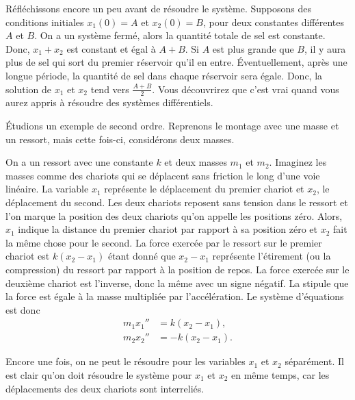\begin{example}
Réfléchissons encore un peu avant de résoudre le système. Supposons des conditions initiales $x_1(0) = A$ et $x_2(0) = B$, pour deux constantes différentes $A$ et $B$.  On a un système fermé, alors la quantité totale de sel est constante. Donc, $x_1+x_2$ est constant et égal à $A+B$.
Si $A$ est plus grande que $B$, il y aura plus de sel qui sort du premier réservoir qu’il en entre. Éventuellement, après une longue période, la quantité de sel dans chaque réservoir sera égale. Donc, la solution de $x_1$ et $x_2$ tend vers $\frac{A+B}{2}$.  Vous découvrirez que c'est vrai quand vous aurez appris à résoudre des systèmes différentiels.
\end{example}

\begin{example} \label{sintro:carts-example}
Étudions un exemple de second ordre. Reprenons le montage avec une masse et un ressort, mais cette fois-ci, considérons deux masses.

\begin{mywrapfigsimp}{2.0in}{2.3in}
\noindent
{}
\end{mywrapfigsimp}
On a un ressort avec une constante $k$ et deux masses $m_1$
et $m_2$. Imaginez les masses comme des chariots qui se déplacent sans friction le long d'une voie linéaire. La variable $x_1$ représente le déplacement du premier chariot et $x_2$, le déplacement du second. Les deux chariots reposent sans tension dans le ressort et l'on marque la position des deux chariots qu'on appelle les positions zéro. Alors, $x_1$ indique la distance du premier chariot par rapport à sa position zéro et $x_2$ fait la même chose pour le second. La force exercée par le ressort sur le premier chariot est
$k(x_2-x_1)$ étant donné que 
$x_2-x_1$ représente l’étirement (ou la compression) du ressort par rapport à la position de repos. La force exercée sur le deuxième chariot est l'inverse, donc la même avec un signe négatif. La 
 stipule que la force est égale à la masse multipliée par l’accélération. Le système d’équations est donc
\begin{align*}
m_1 x_1'' & = k(x_2-x_1) , \\
m_2 x_2'' & = - k(x_2-x_1) .
\end{align*}

Encore une fois, on ne peut le résoudre pour les variables $x_1$ et $x_2$ séparément. Il est clair qu'on doit résoudre le système pour $x_1$ et $x_2$ en même temps, car les déplacements des deux chariots sont interreliés.
\end{example}

